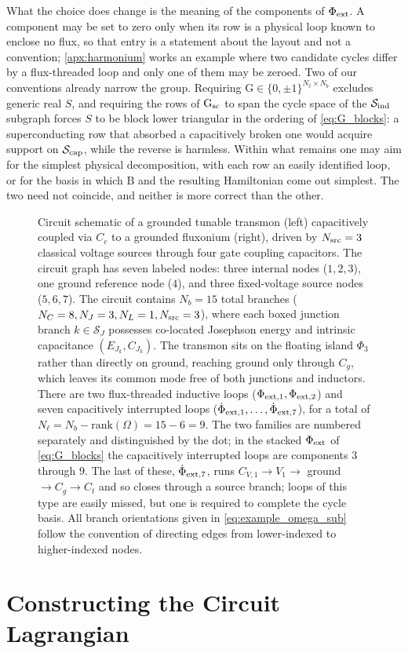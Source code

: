 \documentclass[10pt,aps,pra,onecolumn,superscriptaddress,floatfix,nofootinbib]{revtex4-2}
\begin{document}
What the choice does change is the meaning of the components of $\Phi_{\rm ext}$.
A component may be set to zero only when its row is a physical loop known to enclose no flux, so that entry is a statement about the layout and not a convention; \cref{apx:harmonium} works an example where two candidate cycles differ by a flux-threaded loop and only one of them may be zeroed.
Two of our conventions already narrow the group.
Requiring $\mathrm{G} \in \{0,\pm1\}^{N_\ell\times N_b}$ excludes generic real $S$, and requiring the rows of $\mathrm{G}_{\rm sc}$ to span the cycle space of the $\mathcal{S}_{\rm ind}$ subgraph forces $S$ to be block lower triangular in the ordering of \cref{eq:G_blocks}: a superconducting row that absorbed a capacitively broken one would acquire support on $\mathcal{S}_{\rm cap}$, while the reverse is harmless.
Within what remains one may aim for the simplest physical decomposition, with each row an easily identified loop, or for the basis in which $\mathrm{B}$ and the resulting Hamiltonian come out simplest.
The two need not coincide, and neither is more correct than the other.


\begin{figure}[t]
\centering
{}
\caption{Circuit schematic of a grounded tunable transmon (left) capacitively coupled via $C_c$ to a grounded fluxonium (right), driven by $N_{\rm src} = 3$ classical voltage sources through four gate coupling capacitors.
The circuit graph has seven labeled nodes: three internal nodes ($1, 2, 3$), one ground reference node ($4$), and three fixed-voltage source nodes ($5, 6, 7$).
The circuit contains $N_b = 15$ total branches ($N_C = 8, N_J = 3, N_L = 1, N_{\rm src} = 3$), where each boxed junction branch $k \in \mathcal{S}_J$ possesses co-located Josephson energy and intrinsic capacitance $(E_{J_k}, C_{J_k})$.
The transmon sits on the floating island $\Phi_3$ rather than directly on ground, reaching ground only through $C_g$, which leaves its common mode free of both junctions and inductors.
There are two flux-threaded inductive loops ($\Phi_{\rm ext,1}, \Phi_{\rm ext,2}$) and seven capacitively interrupted loops ($\dot\Phi_{{\rm ext}, 1}, \dots, \dot\Phi_{{\rm ext}, 7}$), for a total of $N_\ell = N_b - \mathrm{rank}(\Omega) = 15 - 6 = 9$.
The two families are numbered separately and distinguished by the dot; in the stacked $\Phi_{\rm ext}$ of \cref{eq:G_blocks} the capacitively interrupted loops are components $3$ through $9$.
The last of these, $\dot\Phi_{{\rm ext}, 7}$, runs $C_{V,1} \to V_1 \to$ ground $\to C_g \to C_t$ and so closes through a source branch; loops of this type are easily missed, but one is required to complete the cycle basis.
All branch orientations given in \cref{eq:example_omega_sub} follow the convention of directing edges from lower-indexed to higher-indexed nodes.}
\label{fig:coupled_circuit_example}
\end{figure}

\section{Constructing the Circuit Lagrangian}\label{apx:full_eq}
\end{document}
